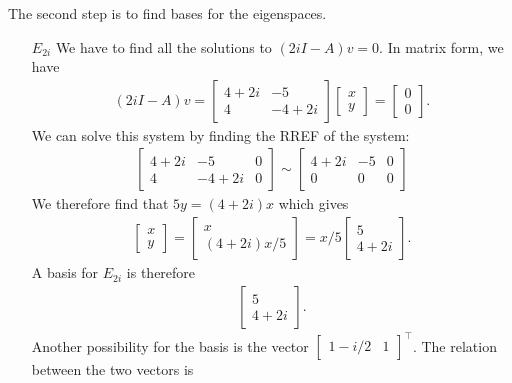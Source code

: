 \documentclass[12pt]{article}
\begin{document}
	The second step is to find bases for the eigenspaces.
	\begin{enumerate}
	\item[\underline{$E_{2i}$}] We have to find all the solutions to $(2iI - A)v = 0$. In matrix form, we have
		\begin{align*}
		(2iI - A)v = \begin{bmatrix}
		4 + 2i & -5 \\ 4 & -4 + 2i
		\end{bmatrix} \begin{bmatrix}
		x \\ y
		\end{bmatrix} = \begin{bmatrix}
		0 \\ 0
		\end{bmatrix} .
		\end{align*}
	We can solve this system by finding the RREF of the system:
		\begin{align*}
		\begin{bmatrix}
		4 + 2i & -5 & 0 \\
		4 & -4 + 2i & 0
		\end{bmatrix} \sim 
		\left[\begin{matrix}4 + 2 i & -5 & 0\\0 & 0 & 0\end{matrix}\right]
		\end{align*}
	We therefore find that $5y = (4 + 2i) x$ which gives
		\begin{align*}
		\begin{bmatrix}
		x \\ y
		\end{bmatrix} = \begin{bmatrix}
		x \\ (4 + 2i)x/5
		\end{bmatrix} = x/5 \begin{bmatrix}
		5 \\ 4 + 2i
		\end{bmatrix} .
		\end{align*}
	A basis for $E_{2i}$ is therefore 
		\begin{align*}
		\begin{bmatrix}
		5 \\ 4 + 2i
		\end{bmatrix} .
		\end{align*}
	Another possibility for the basis is the vector $\begin{bmatrix} 1 - i/2 & 1 \end{bmatrix}^{\top}$. The relation between the two vectors is

\end{enumerate}
\end{document}
